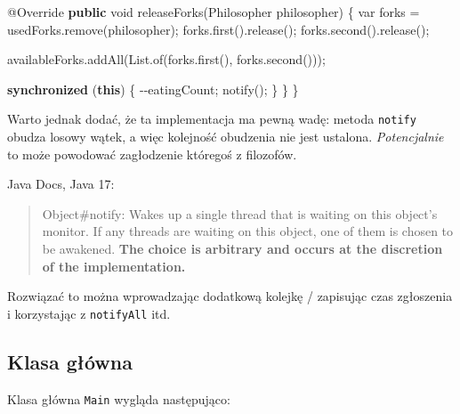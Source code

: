 \documentclass[11pt]{article}
\newenvironment{Shaded}{}{}
\newcommand{\KeywordTok}[1]{\textcolor[rgb]{0.00,0.44,0.13}{\textbf{{#1}}}}
\newcommand{\DataTypeTok}[1]{\textcolor[rgb]{0.56,0.13,0.00}{{#1}}}
\newcommand{\FunctionTok}[1]{\textcolor[rgb]{0.02,0.16,0.49}{{#1}}}
\newcommand{\NormalTok}[1]{{#1}}
\newcommand{\OperatorTok}[1]{\textcolor[rgb]{0.40,0.40,0.40}{{#1}}}
\newcommand{\BuiltInTok}[1]{{#1}}
\newcommand{\AttributeTok}[1]{\textcolor[rgb]{0.49,0.56,0.16}{{#1}}}
\begin{document}
\begin{Shaded}
\begin{Highlighting}[]
    \AttributeTok{@Override}
    \KeywordTok{public} \DataTypeTok{void} \FunctionTok{releaseForks}\OperatorTok{(}\NormalTok{Philosopher philosopher}\OperatorTok{)} \OperatorTok{\{}
        \DataTypeTok{var}\NormalTok{ forks }\OperatorTok{=}\NormalTok{ usedForks}\OperatorTok{.}\FunctionTok{remove}\OperatorTok{(}\NormalTok{philosopher}\OperatorTok{);}
\NormalTok{        forks}\OperatorTok{.}\FunctionTok{first}\OperatorTok{().}\FunctionTok{release}\OperatorTok{();}
\NormalTok{        forks}\OperatorTok{.}\FunctionTok{second}\OperatorTok{().}\FunctionTok{release}\OperatorTok{();}

\NormalTok{        availableForks}\OperatorTok{.}\FunctionTok{addAll}\OperatorTok{(}\BuiltInTok{List}\OperatorTok{.}\FunctionTok{of}\OperatorTok{(}\NormalTok{forks}\OperatorTok{.}\FunctionTok{first}\OperatorTok{(),}\NormalTok{ forks}\OperatorTok{.}\FunctionTok{second}\OperatorTok{()));}

        \KeywordTok{synchronized} \OperatorTok{(}\KeywordTok{this}\OperatorTok{)} \OperatorTok{\{}
            \OperatorTok{{-}{-}}\NormalTok{eatingCount}\OperatorTok{;}
            \FunctionTok{notify}\OperatorTok{();}
        \OperatorTok{\}}
    \OperatorTok{\}}
\OperatorTok{\}}
\end{Highlighting}
\end{Shaded}

Warto jednak dodać, że ta implementacja ma pewną wadę: metoda
\texttt{notify} obudza losowy wątek, a więc kolejność obudzenia nie jest
ustalona. \emph{Potencjalnie} to może powodować zagłodzenie któregoś z
filozofów.

Java Docs, Java 17:

\begin{quote}
Object\#notify: Wakes up a single thread that is waiting on this
object's monitor. If any threads are waiting on this object, one of them
is chosen to be awakened. \textbf{The choice is arbitrary and occurs at
the discretion of the implementation.}
\end{quote}

Rozwiązać to można wprowadzając dodatkową kolejkę / zapisując czas
zgłoszenia i korzystając z \texttt{notifyAll} itd.

    \hypertarget{klasa-gux142uxf3wna}{%
\subsection{Klasa główna}\label{klasa-gux142uxf3wna}}

Klasa główna \texttt{Main} wygląda następująco:
\end{document}
